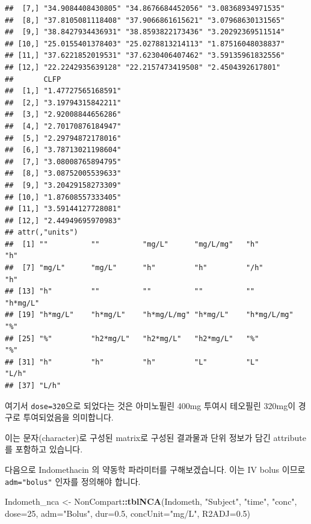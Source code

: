 \documentclass[
  10pt,
]{krantz}
\makeatletter
\newenvironment{Shaded}{\begin{snugshade}}{\end{snugshade}}
\newcommand{\DataTypeTok}[1]{\textcolor[rgb]{0.13,0.29,0.53}{#1}}
\newcommand{\DecValTok}[1]{\textcolor[rgb]{0.00,0.00,0.81}{#1}}
\newcommand{\FloatTok}[1]{\textcolor[rgb]{0.00,0.00,0.81}{#1}}
\newcommand{\KeywordTok}[1]{\textcolor[rgb]{0.13,0.29,0.53}{\textbf{#1}}}
\newcommand{\NormalTok}[1]{#1}
\newcommand{\OperatorTok}[1]{\textcolor[rgb]{0.81,0.36,0.00}{\textbf{#1}}}
\newcommand{\StringTok}[1]{\textcolor[rgb]{0.31,0.60,0.02}{#1}}
\newenvironment{kframe}{%
\medskip{}
\setlength{\fboxsep}{.8em}
 \def\at@end@of@kframe{}%
 \ifinner\ifhmode%
  \def\at@end@of@kframe{\end{minipage}}%
  \begin{minipage}{\columnwidth}%
 \fi\fi%
 \def\FrameCommand##1{\hskip\@totalleftmargin \hskip-\fboxsep
 \colorbox{shadecolor}{##1}\hskip-\fboxsep
     \hskip-\linewidth \hskip-\@totalleftmargin \hskip\columnwidth}%
 \MakeFramed {\advance\hsize-\width
   \@totalleftmargin\z@ \linewidth\hsize
   \@setminipage}}%
 {\par\unskip\endMakeFramed%
 \at@end@of@kframe}
\renewenvironment{Shaded}{\begin{kframe}}{\end{kframe}}
\makeatother
\begin{document}
\begin{verbatim}
##  [7,] "34.9084408430805" "34.8676684452056" "3.08368934971535"
##  [8,] "37.8105081118408" "37.9066861615621" "3.07968630131565"
##  [9,] "38.8427934436931" "38.8593822173436" "3.20292369511514"
## [10,] "25.0155401378403" "25.0278813214113" "1.87516048038837"
## [11,] "37.6221852019531" "37.6230406407462" "3.59135961832556"
## [12,] "22.2242935639128" "22.2157473419508" "2.4504392617801" 
##       CLFP              
##  [1,] "1.47727565168591"
##  [2,] "3.19794315842211"
##  [3,] "2.92008844656286"
##  [4,] "2.70170876184947"
##  [5,] "2.29794872178016"
##  [6,] "3.78713021198604"
##  [7,] "3.08008765894795"
##  [8,] "3.08752005539633"
##  [9,] "3.20429158273309"
## [10,] "1.87608557333405"
## [11,] "3.59144127728081"
## [12,] "2.44949695970983"
## attr(,"units")
##  [1] ""          ""          "mg/L"      "mg/L/mg"   "h"         "h"        
##  [7] "mg/L"      "mg/L"      "h"         "h"         "/h"        "h"        
## [13] "h"         ""          ""          ""          ""          "h*mg/L"   
## [19] "h*mg/L"    "h*mg/L"    "h*mg/L/mg" "h*mg/L"    "h*mg/L/mg" "%"        
## [25] "%"         "h2*mg/L"   "h2*mg/L"   "h2*mg/L"   "%"         "%"        
## [31] "h"         "h"         "h"         "L"         "L"         "L/h"      
## [37] "L/h"
\end{verbatim}

여기서 \texttt{dose=320}으로 되었다는 것은 아미노필린 400mg 투여시 테오필린 320mg이 경구로 투여되었음을 의미합니다.

이는 문자(character)로 구성된 matrix로 구성된 결과물과 단위 정보가 담긴 attribute를 포함하고 있습니다.

다음으로 Indomethacin 의 약동학 파라미터를 구해보겠습니다.
이는 IV bolus 이므로 \texttt{adm="bolus"} 인자를 정의해야 합니다.

\begin{Shaded}
\begin{Highlighting}[]
\NormalTok{Indometh\_nca \textless{}{-}}\StringTok{ }\NormalTok{NonCompart}\OperatorTok{::}\KeywordTok{tblNCA}\NormalTok{(Indometh, }\StringTok{"Subject"}\NormalTok{, }\StringTok{"time"}\NormalTok{, }\StringTok{"conc"}\NormalTok{, }
                       \DataTypeTok{dose=}\DecValTok{25}\NormalTok{, }\DataTypeTok{adm=}\StringTok{"Bolus"}\NormalTok{, }\DataTypeTok{dur=}\FloatTok{0.5}\NormalTok{, }\DataTypeTok{concUnit=}\StringTok{"mg/L"}\NormalTok{, }\DataTypeTok{R2ADJ=}\FloatTok{0.5}\NormalTok{)}
\end{Highlighting}
\end{Shaded}
\end{document}
